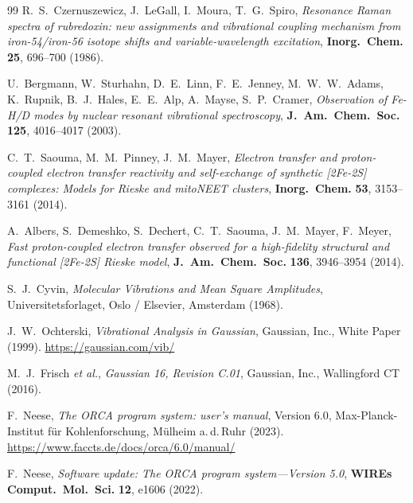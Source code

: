 \documentclass[11pt,a4paper,twoside]{article}
\theoremstyle{remark}
\begin{document}
\begin{thebibliography}{99}
R.~S.~Czernuszewicz, J.~LeGall, I.~Moura, T.~G.~Spiro,
\emph{Resonance Raman spectra of rubredoxin: new assignments and
vibrational coupling mechanism from iron-54/iron-56 isotope shifts
and variable-wavelength excitation},
\textbf{Inorg.\ Chem.} \textbf{25}, 696--700 (1986).

U.~Bergmann, W.~Sturhahn, D.~E.~Linn, F.~E.~Jenney, M.~W.~W.~Adams,
K.~Rupnik, B.~J.~Hales, E.~E.~Alp, A.~Mayse, S.~P.~Cramer,
\emph{Observation of {Fe-H/D} modes by nuclear resonant vibrational
spectroscopy},
\textbf{J.\ Am.\ Chem.\ Soc.} \textbf{125}, 4016--4017 (2003).

C.~T.~Saouma, M.~M.~Pinney, J.~M.~Mayer,
\emph{Electron transfer and proton-coupled electron transfer reactivity
and self-exchange of synthetic {[}2Fe-2S{]} complexes:
Models for Rieske and mitoNEET clusters},
\textbf{Inorg.\ Chem.} \textbf{53}, 3153--3161 (2014).

A.~Albers, S.~Demeshko, S.~Dechert, C.~T.~Saouma, J.~M.~Mayer, F.~Meyer,
\emph{Fast proton-coupled electron transfer observed for a high-fidelity
structural and functional {[}2Fe-2S{]} {Rieske} model},
\textbf{J.\ Am.\ Chem.\ Soc.} \textbf{136}, 3946--3954 (2014).


S.~J.~Cyvin,
\emph{Molecular Vibrations and Mean Square Amplitudes},
Universitetsforlaget, Oslo / Elsevier, Amsterdam (1968).

J.~W.~Ochterski,
\emph{Vibrational Analysis in Gaussian},
Gaussian, Inc., White Paper (1999).
\url{https://gaussian.com/vib/}

M.~J.~Frisch \emph{et al.},
\emph{Gaussian 16, Revision C.01},
Gaussian, Inc., Wallingford CT (2016).

F.~Neese,
\emph{The ORCA program system: user's manual},
Version 6.0, Max-Planck-Institut f\"ur Kohlenforschung,
M\"ulheim a.\,d.\,Ruhr (2023).
\url{https://www.faccts.de/docs/orca/6.0/manual/}

F.~Neese,
\emph{Software update: The ORCA program system---Version 5.0},
\textbf{WIREs Comput.\ Mol.\ Sci.} \textbf{12}, e1606 (2022).

\end{thebibliography}
\end{document}
